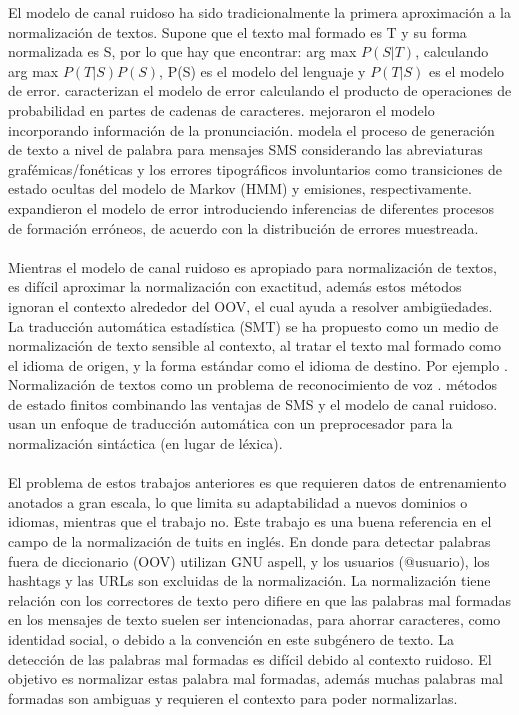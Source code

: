 \documentclass[spanish,12pt, a4paper,twoside]{paper}
\begin{document}
El modelo de canal ruidoso \cite{shannon:1948} ha sido tradicionalmente la primera aproximación a la normalización de textos. Supone que el texto mal formado es T y su forma normalizada es S, por lo que hay que encontrar: arg max $P(S|T)$, calculando arg max $P(T|S) P(S)$, P(S) es el modelo del lenguaje y $P(T|S)$ es el modelo de error. \cite{brillmoore:2000} caracterizan el modelo de error calculando el producto de operaciones de probabilidad en partes de cadenas de caracteres. \cite{toutanovamoore:2002} mejoraron el modelo incorporando información de la pronunciación. \cite{choudhury:2007} modela el proceso de generación de texto a nivel de palabra para mensajes SMS considerando las abreviaturas grafémicas/fonéticas y los errores tipográficos involuntarios como transiciones de estado ocultas del modelo de Markov (HMM) y emisiones, respectivamente. \cite{cookstevenson:2009} expandieron el modelo de error introduciendo inferencias de diferentes procesos de formación erróneos, de acuerdo con la distribución de errores muestreada.\\\\Mientras el modelo de canal ruidoso es apropiado para normalización de textos, es difícil aproximar la normalización con exactitud, además estos métodos ignoran el contexto alrededor del OOV, el cual ayuda a resolver ambigüedades. La traducción automática estadística (SMT) se ha propuesto como un medio de normalización de texto sensible al contexto, al tratar el texto mal formado como el idioma de origen, y la forma estándar como el idioma de destino. Por ejemplo \cite{aw:2006}. Normalización de textos como un problema de reconocimiento de voz \cite{kobus:2008}. \cite{beaufort:2002} métodos de estado finitos combinando las ventajas de SMS y el modelo de canal ruidoso. \cite{kaufmannkalita:2010} usan un enfoque de traducción automática con un preprocesador para la normalización sintáctica (en lugar de léxica).\\\\El problema de estos trabajos anteriores es que requieren datos de entrenamiento anotados a gran escala, lo que limita su adaptabilidad a nuevos dominios o idiomas, mientras que el trabajo \cite{baldwin:2011} no. Este trabajo es una buena referencia en el campo de la normalización de tuits en inglés. En donde para detectar palabras fuera de diccionario (OOV) utilizan GNU aspell, y los usuarios (@usuario), los hashtags y las URLs son excluidas de la normalización. La normalización tiene relación con los correctores de texto \cite{peterson:1980} pero difiere en que las palabras mal formadas en los mensajes de texto suelen ser intencionadas, para ahorrar caracteres, como identidad social, o debido a la convención en este subgénero de texto. La detección de las palabras mal formadas es difícil debido al contexto ruidoso. El objetivo es normalizar estas palabra mal formadas, además muchas palabras mal formadas son ambiguas y requieren el contexto para poder normalizarlas.
\end{document}
